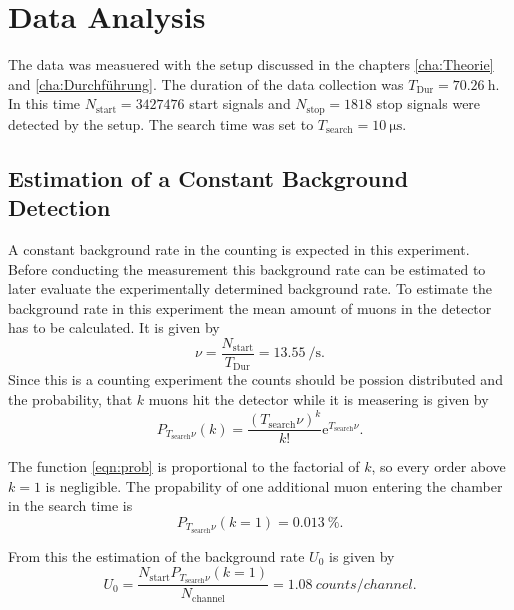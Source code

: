 \chapter{Data Analysis}
\label{cha:Auswertung}
The data was measuered with the setup discussed in the chapters \ref{cha:Theorie} and \ref{cha:Durchführung}. The duration of the data collection was $T_\mathrm{Dur} = \qty{70.26}{\hour}$. In this 
time $N_{\mathrm{start}} = \num{3427476}$ start signals and $N_{\mathrm{stop}} = \num{1818}$ stop signals were detected by the setup. The search time was set to 
$T_\mathrm{search} = \qty{10}{\micro\second}$.

\section{Estimation of a Constant Background Detection}
\label{sec:background}
A constant background rate in the counting is expected in this experiment. Before conducting the measurement this background rate can be estimated to later evaluate the experimentally 
determined background rate. To estimate the background rate in this experiment the mean amount of muons in the detector has to be calculated. It is given by 
\begin{equation}
    \label{eqn:muon_amount}
    \nu = \frac{N_\mathrm{start}}{T_\mathrm{Dur}} = \qty{13.55}{\per\second} .
\end{equation}
Since this is a counting experiment the counts should be possion distributed and the probability, that $k$ muons hit the detector while it is measering is given by
\begin{equation}
    \label{eqn:prob}
    P_{T_\mathrm{search}\nu}(k) = \frac{(T_\mathrm{search}\nu)^k}{k!}\mathrm{e}^{T_\mathrm{search}\nu} .
\end{equation}

The function \ref{eqn:prob} is proportional to the factorial of $k$, so every order above $k=1$ is negligible. The propability of one additional muon entering the chamber in the 
search time is 
\begin{equation*}
    P_{T_\mathrm{search}\nu}(k=1) = \qty{0.013}{\percent} .
\end{equation*}

From this the estimation of the background rate $U_0$ is given by 
\begin{equation}
    \label{eqn:background}
    U_0 = \frac{N_\mathrm{start}P_{T_\mathrm{search}\nu}(k=1)}{N_\mathrm{channel}} = \qty{1.08}{counts\per channel} .
\end{equation}

